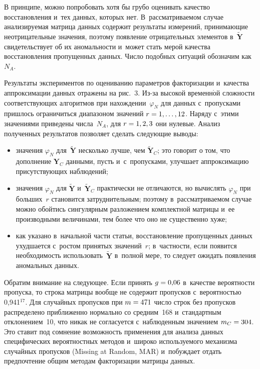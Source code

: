 \begin{multicols}{2}
     
     В принципе, можно попробовать хотя бы грубо оценивать качество 
восстановления и~тех данных, которых нет. В~рассматриваемом случае 
анализируемая матрица данных содержит результаты измерений, 
принимающие неотрицательные значения, поэтому появление отрицательных 
элементов в~$\tilde{\mathbf{Y}}$ свидетельствует об их аномальности и~может 
стать мерой качества восстановления пропущенных данных. Число подобных 
ситуаций обозначим как~$N_A$. 
     


     
     Результаты экспериментов по оцениванию параметров факторизации 
     и~качества аппроксимации данных отражены на рис.~3. Из-за высокой 
временн$\acute{\mbox{о}}$й сложности соответствующих алгоритмов при 
нахождении~$\varphi_N$ для данных с~пропусками пришлось ограничиться 
диапазоном значений $r\hm=1, \ldots , 12$. Наряду с~этими значениями 
приведены числа~$N_A$, для $r\hm= 1,2,3$ они нулевые. Анализ полученных 
результатов позволяет сделать следующие выводы:
     \begin{itemize}
\item значения $\varphi_N$ для~$\tilde{\mathbf{Y}}$ несколько лучше, чем 
$\tilde{\mathbf{Y}}_C$; это говорит о том, что дополнение $\mathbf{Y}_C$ 
данными, пусть и~с~пропусками, улучшает аппроксимацию присутствующих 
наблюдений; 
\item значения $\varphi_N$ для $\tilde{\mathbf{Y}}$ и~$\tilde{\mathbf{Y}}_C$ 
практически не отличаются, но вычислять $\varphi_N$ при больших~$r$ 
становится затруднительным; поэтому в~рассматриваемом случае можно 
обойтись сингулярным разложением комплектной матрицы и~ее производными 
величинами, тем более что оно не существенно хуже;
\item как указано в~начальной части статьи, восстановление пропущенных 
данных ухудшается с~ростом принятых значений~$r$; в~частности, если 
появится необходимость использовать~$\tilde{\mathbf{Y}}$ в~полной мере, то 
следует ожидать появления аномальных данных.
\end{itemize}
     
     Обратим внимание на следующее. Если принять $g\hm= 0{,}06$ 
в~качестве вероятности пропуска, то строка матрицы вообще не содержит 
пропусков с~вероятностью 0,941$^{17}$. Для случайных пропусков при $m\hm= 471$ число 
строк без пропусков распределено приближенно нормально со средним~168 
и~стандартным отклонением~10, что никак не согласуется с~наблюденным 
значением $m_C\hm= 304$. Это ставит под сомнение возможность применения 
для анализа данных специфических вероятностных методов и~широко 
используемого механизма случайных пропусков (Missing at Random, MAR) 
и~побуждает отдать предпочтение общим методам факторизации матрицы 
данных. 


\end{multicols}

